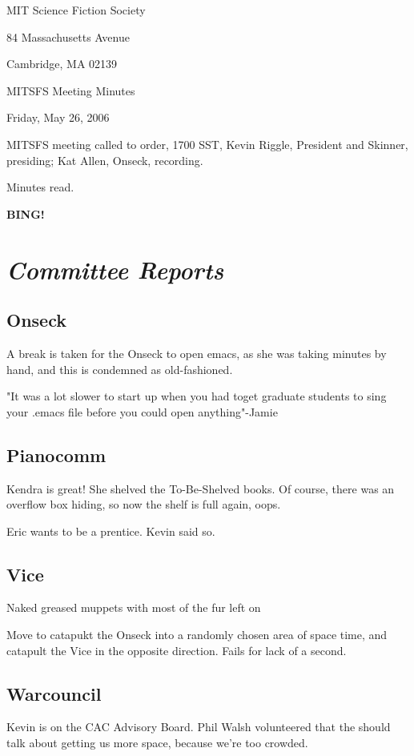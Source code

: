 \documentclass[10pt]{article}
\newcommand{\bing}{{\bf BING!} }
\newcommand{\goto}[1]{\bing \vskip 12pt \section*{{\em{#1}}}}
\begin{document}
\begin{center}

MIT Science Fiction Society

84 Massachusetts Avenue

Cambridge, MA 02139

\vspace{12pt}

MITSFS Meeting Minutes

Friday, May 26, 2006

\end{center}

\vspace{18pt}

\setlength{\parskip}{6pt}

\noindent
MITSFS meeting called to order, 1700 SST,
Kevin Riggle, President and Skinner, presiding; Kat Allen, Onseck, recording.

Minutes read.

\goto{Committee Reports}

\subsection*{Onseck}
A break is taken for the Onseck to open emacs, as she was taking
minutes by hand, and this is condemned as old-fashioned.

"It was a lot slower to start up when you had toget graduate students
to sing your .emacs file before you could open anything"-Jamie

\subsection*{Pianocomm}
Kendra is great! She shelved the To-Be-Shelved books. 
Of course, there was an overflow box hiding, so now the shelf is full
again, oops.

Eric wants to be a prentice. Kevin said so.

\subsection*{Vice} 

Naked greased muppets with most of the fur left on 

Move to catapukt the Onseck into a randomly chosen area of space time,
and catapult the Vice in the opposite direction.
Fails for lack of a second.

\subsection*{Warcouncil}
 Kevin is on the CAC Advisory Board. Phil Walsh volunteered
that the should talk about getting us more space, because we're too
crowded.
\end{document}
